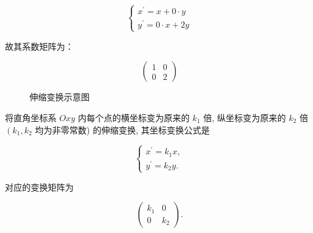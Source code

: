 \documentclass[lang=cn,newtx,10pt,scheme=chinese]{elegantbook}
\begin{document}
\begin{equation}
\left\{\begin{array}{l}
x^{\prime}=x  + 0 \cdot y\\
y^{\prime}=0 \cdot x + 2 y
\end{array}\right.
\label{eq:伸缩变换的方程}
\end{equation}

故其系数矩阵为：

\begin{equation}
\left(\begin{array}{rr}
1  & 0 \\
0  & 2
\end{array}\right)
\label{eq:伸缩变换示例矩阵}
\end{equation}


\begin{figure}[h]
\centering
{}
\caption{伸缩变换示意图\label{fig:伸缩变换}}
\end{figure}

\begin{exercise}

    将直角坐标系 $O x y$ 内每个点的横坐标变为原来的 $k_1$ 倍, 纵坐标变为原来的 $k_2$ 倍 $\left(k_1, k_2\right.$ 均为非零常数) 的伸缩变换, 其坐标变换公式是
    
    \begin{equation}
        \left\{\begin{array}{l}
    x^{\prime}=k_1 x, \\
    y^{\prime}=k_2 y .
    \end{array}\right.
    \label{伸缩变换一般表达式}
    \end{equation}
    
    对应的变换矩阵为 
    
    \begin{equation}
    \left(\begin{array}{cc}k_1 & 0 \\ 0 & k_2\end{array}\right).
    \label{伸缩变换一般矩阵}
    \end{equation}

\end{exercise}
\end{document}

